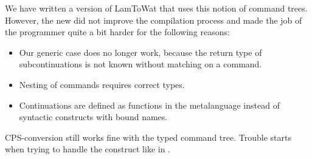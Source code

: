 We have written a version of LamToWat that uses this notion of command trees. However, the new  did not improve the compilation process and made the job of the programmer quite a bit harder for the following reasons:

\begin{itemize}
\item Our generic case does no longer work, because the return type of subcontinuations  is not known without matching on a command.
\item Nesting of commands requires correct types.
\item Continuations are defined as functions in the metalanguage instead of syntactic constructs with bound names.
\end{itemize}

CPS-conversion still works fine with the typed command tree. Trouble starts when trying to handle the  construct like in . 
